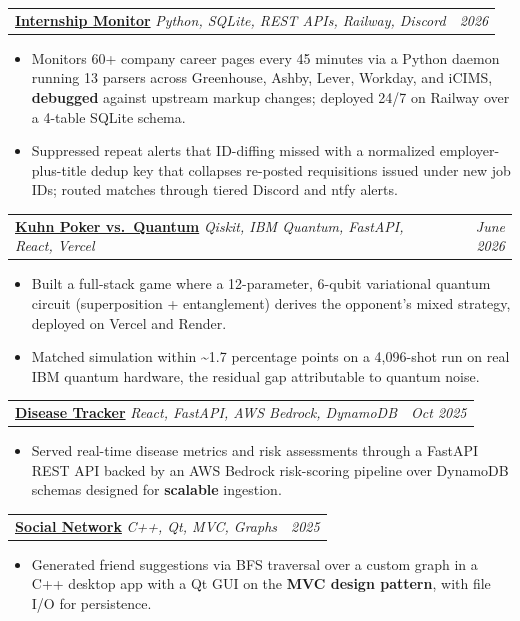 \documentclass[letterpaper,10pt]{article}
\makeatletter
\newcommand{\nk}{\kern0pt}
\newcommand{\pipe}{\textbar{}}
\newcommand{\resumeItem}[1]{
  \item\small{
    {#1 \vspace{-3pt}}
  }
}
\newcommand{\resumeProjectHeading}[2]{
    \item
    \begin{tabular*}{0.97\textwidth}{l@{\extracolsep{\fill}}r}
      \small#1 & \small\emph{#2} \\   %
    \end{tabular*}\vspace{-7pt}
}
\newcommand{\resumeItemListStart}{\begin{itemize}}
\newcommand{\resumeItemListEnd}{\end{itemize}\vspace{-7pt}}
\makeatother
\begin{document}

      \resumeProjectHeading
          {\textbf{\href{https://github.com/spoigai21/jobscraper}{Internship Monitor}} \pipe{} \emph{Python, SQLite, REST APIs, Railway, Discord}}{2026}
          \resumeItemListStart
            \resumeItem{Monitors 60+ company career pages every 45 minutes via a Python daemon running 13 parsers across Greenhouse, Ashby, Lever, Workday, and iCIMS, \textbf{debugged} against upstream markup changes; deployed 24/7 on Railway over a 4-table SQLite schema.}
            \resumeItem{Suppressed repeat alerts that ID-diffing missed with a normalized employer-plus-title dedup key that collapses re-posted requisitions issued under new job IDs; routed matches through tiered Discord and ntfy alerts.}
          \resumeItemListEnd

      \resumeProjectHeading
          {\textbf{\href{https://github.com/spoigai21/kuhn-quantum-poker}{Kuhn Poker vs.\ Quantum}} \pipe{} \emph{Qiskit, IBM Quantum, FastAPI, React, Vercel}}{June 2026}
          \resumeItemListStart
            \resumeItem{Built a full-stack game where a 12-parameter, 6-qubit variational quantum circuit (superposition + entanglement) derives the opponent's mixed strategy, deployed on Vercel and Render.}
            \resumeItem{Matched simulation within \textasciitilde1.7 percentage points on a 4,096-shot run on real IBM quantum hardware, the residual gap attributable to quantum noise.}
          \resumeItemListEnd

      \resumeProjectHeading
          {\textbf{\href{https://github.com/tatertotbot/AWS-Inrix-2025}{Disease T\nk racker}} \pipe{} \emph{React, FastAPI, A\nk WS Bedrock, DynamoDB}}{Oct 2025}
          \resumeItemListStart
            \resumeItem{Served real-time disease metrics and risk assessments through a FastAPI REST API backed by an A\nk WS Bedrock risk-scoring pipeline over DynamoDB schemas designed for \textbf{scalable} ingestion.}
          \resumeItemListEnd
      \resumeProjectHeading
          {\textbf{\href{https://github.com/spoigai21/socialnetwork}{Social Network}} \pipe{} \emph{C++, Qt, MVC, Graphs}}{2025}
          \resumeItemListStart
            \resumeItem{Generated friend suggestions via BFS traversal over a custom graph in a C++ desktop app with a Qt GUI on the \textbf{MVC design pattern}, with file I/O for persistence.}
          \resumeItemListEnd
\end{document}
